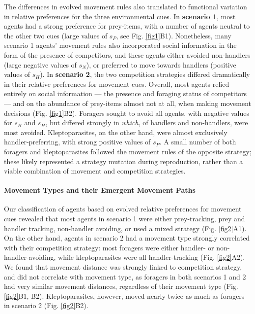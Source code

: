     The differences in evolved movement rules also translated to functional variation in relative preferences for the three environmental cues.
    In \textbf{scenario 1}, most agents had a strong preference for prey-items, with a number of agents neutral to the other two cues (large values of $s_P$, see Fig. \ref{fig1}B1).
    Nonetheless, many scenario 1 agents' movement rules also incorporated social information in the form of the presence of competitors, and these agents either avoided non-handlers (large negative values of $s_N$), or preferred to move towards handlers (positive values of $s_H$).
    In \textbf{scenario 2}, the two competition strategies differed dramatically in their relative preferences for movement cues.
    Overall, most agents relied entirely on social information --- the presence and foraging status of competitors --- and on the abundance of prey-items almost not at all, when making movement decisions (Fig. \ref{fig1}B2).
    Foragers sought to avoid all agents, with negative values for $s_H$ and $s_H$, but differed strongly in \textit{which}, of handlers and non-handlers, were most avoided.
    Kleptoparasites, on the other hand, were almost exclusively handler-preferring, with strong positive values of $s_P$.
    A small number of both foragers and kleptoparasites followed the movement rules of the opposite strategy; these likely represented a strategy mutation during reproduction, rather than a viable combination of movement and competition strategies.
    
    \paragraph{Movement Types and their Emergent Movement Paths}
    
    Our classification of agents based on evolved relative preferences for movement cues revealed that most agents in scenario 1 were either prey-tracking, prey and handler tracking, non-handler avoiding, or used a mixed strategy (Fig. \ref{fig2}A1).
    On the other hand, agents in scenario 2 had a movement type strongly correlated with their competition strategy: most foragers were either handler- or non-handler-avoiding, while kleptoparasites were all handler-tracking (Fig. \ref{fig2}A2).
    We found that movement distance was strongly linked to competition strategy, and did not correlate with movement type, as foragers in both scenarios 1 and 2 had very similar movement distances, regardless of their movement type (Fig. \ref{fig2}B1, B2).
    Kleptoparasites, however, moved nearly twice as much as foragers in scenario 2 (Fig. \ref{fig2}B2).
    
